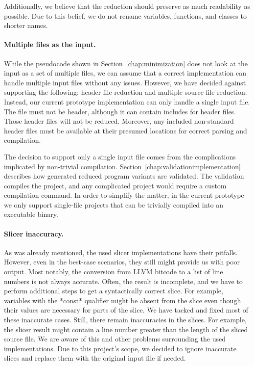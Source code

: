 Additionally, we believe that the reduction should preserve as much 
readability as possible. 
Due to this belief, we do not rename variables, functions, and classes to 
shorter names.

\paragraph{Multiple files as the input.}
While the pseudocode shown in Section~\ref{chap:minimization} does not look 
at the input as a set of multiple files, we can assume that a correct 
implementation can handle multiple input files without any issues. 
However, we have decided against supporting the following: header file 
reduction and multiple source file reduction. 
Instead, our current prototype implementation can only handle a single input
file.
The file must not be header, although it can contain includes for header 
files. 
Those header files will not be reduced. 
Moreover, any included non-standard header files must be available at their 
presumed locations for correct parsing and compilation.

The decision to support only a single input file comes from 
the complications implicated by non-trivial compilation. 
Section~\ref{chap:validationimplementation} describes how generated reduced 
program variants are validated. 
The validation compiles the project, and any complicated project would 
require a custom compilation command. 
In order to simplify the matter, in the current prototype we only support 
single-file projects that can be trivially compiled into an executable 
binary.

\paragraph{Slicer inaccuracy.}
As was already mentioned, the used slicer implementations have their 
pitfalls. 
However, even in the best-case scenarios, they still might provide us with 
poor output. 
Most notably, the conversion from LLVM bitcode to a list of line numbers is 
not always accurate. 
Often, the result is incomplete, and we have to perform additional steps to 
get a syntactically correct slice. 
For example, variables with the *const* qualifier might be absent from 
the slice even though their values are necessary for parts of the slice. 
We have tacked and fixed most of these inaccurate cases. 
Still, there remain inaccuracies in the slices. 
For example, the slicer result might contain a line number greater than 
the length of the sliced source file. 
We are aware of this and other problems surrounding the used implementations. 
Due to this project's scope, we decided to ignore inaccurate slices and 
replace them with the original input file if needed.

